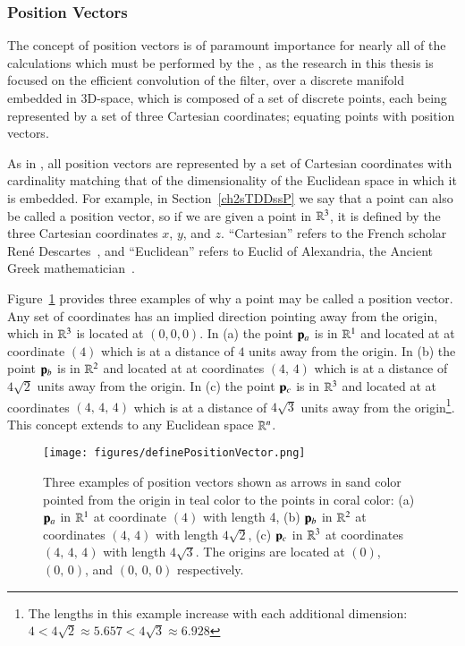 %
%
\subsubsection{Position Vectors}
\label{ch2sETBssLAsssPV}
The concept of position vectors is of paramount importance for nearly all of the calculations which must be performed by the , as the research in this thesis is focused on the efficient convolution of the filter, over a discrete manifold embedded in 3D-space, which is composed of a set of discrete points, each being represented by a set of three Cartesian coordinates; equating points with position vectors.

As in \tdd{}, all position vectors are represented by a set of Cartesian coordinates with cardinality matching that of the dimensionality of the Euclidean space in which it is embedded. For example, in Section~\ref{ch2sTDDssP} we say that a point can also be called a position vector, so if we are given a point in $\mathbb{R}^{3}$, it is defined by the three Cartesian coordinates $x$, $y$, and $z$. ``Cartesian'' refers to the French scholar René Descartes~\cite{EB1}, and ``Euclidean'' refers to Euclid of Alexandria, the Ancient Greek mathematician~\cite{EB2}.

Figure~\ref{fig:definePositionVector} provides three examples of why a point may be called a position vector. Any set of coordinates has an implied direction pointing away from the origin, which in $\mathbb{R}^{3}$ is located at $(0, 0, 0)$. In (a) the point $\mathbf{p}_a$ is in $\mathbb{R}^{1}$ and located at at coordinate $(4)$ which is at a distance of $4$ units away from the origin. In (b) the point $\mathbf{p}_b$ is in $\mathbb{R}^{2}$ and located at at coordinates $(4,\,4)$ which is at a distance of $4\sqrt{2}$ units away from the origin. In (c) the point $\mathbf{p}_c$ is in $\mathbb{R}^{3}$ and located at at coordinates $(4,\,4,\,4)$ which is at a distance of $4\sqrt{3}$ units away from the origin\footnote{The lengths in this example increase with each additional dimension: $4 < 4\sqrt{2} \approx 5.657 < 4\sqrt{3} \approx 6.928$}. This concept extends to any Euclidean space $\mathbb{R}^{n}$.

\begin{figure}[ht]
\ffigbox
	{\texttt{[image: figures/definePositionVector.png]}}
	{\caption[Examples of Position Vector]{Three examples of position vectors shown as arrows in sand color pointed from the origin in teal color to the points in coral color: (a) $\mathbf{p}_a$ in $\mathbb{R}^{1}$ at coordinate $(4)$ with length 4, (b) $\mathbf{p}_b$ in $\mathbb{R}^{2}$ at coordinates $(4,\,4)$ with length $4\sqrt{2}$, (c) $\mathbf{p}_c$ in $\mathbb{R}^{3}$ at coordinates $(4,\,4,\,4)$ with length $4\sqrt{3}$. The origins are located at $(0)$, $(0,\,0)$, and $(0,\,0,\,0)$ respectively.}\label{fig:definePositionVector}}
\end{figure}


